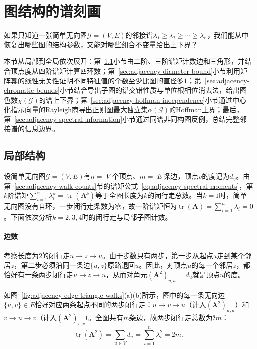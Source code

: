 \section{图结构的谱刻画}
\label{sec:adjacency-spectral-structure}

如果只知道一张简单无向图$\mathcal G=(V,E)$的邻接谱$\lambda_1\ge\lambda_2\ge\cdots\ge\lambda_n$，我们能从中恢复出哪些图的结构参数，又能对哪些组合不变量给出上下界？

本节从局部到全局依次展开：第~\ref{sec:adjacency-low-spectral-moments}小节由二阶、三阶谱矩计数边和三角形，并结合顶点度从四阶谱矩计算四环数；第~\ref{sec:adjacency-diameter-bound}小节利用矩阵幂的线性无关性证明不同特征值的个数至少比图的直径多$1$；第~\ref{sec:adjacency-chromatic-bounds}小节结合导出子图的谱交错性质与单位根相位消去法，给出图色数$\chi(\mathcal G)$的谱上下界；第~\ref{sec:adjacency-hoffman-independence}小节通过中心化指示向量的Rayleigh商导出正则图最大独立集$\alpha(\mathcal G)$的Hoffman上界；最后，第~\ref{sec:adjacency-spectral-information}小节通过同谱非同构图反例，总结完整邻接谱的信息边界。

\subsection{局部结构}
\label{sec:adjacency-low-spectral-moments}

设简单无向图$\mathcal G=(V,E)$有$n=|V|$个顶点、$m=|E|$条边，顶点$v$的度记为$d_v$。由第~\ref{sec:adjacency-walk-counts}节的谱矩公式~\eqref{eq:adjacency-spectral-moments}，第$k$阶谱矩$\sum_{i=1}^n\lambda_i^k=\operatorname{tr}(\bm A^k)$等于全图长度为$k$的闭行走总数。当$k=1$时，简单无向图没有自环，一步闭行走条数为零，故一阶谱矩恒为$\operatorname{tr}(\bm A)=\sum_{i=1}^n\lambda_i=0$。下面依次分析$k=2,3,4$时的闭行走与局部子图计数。

\paragraph{边数}

考察长度为$2$的闭行走$u\to z\to u$。由于步数只有两步，第一步从起点$u$走到某个邻居$z$，第二步必须沿同一条边$\{u,z\}$原路退回$u$。因此，对顶点$u$的每一个邻居$z$，都恰好有一条两步闭行走$u\to z\to u$，从而对角元$(\bm A^2)_{u,u}=d_u$就是顶点$u$的度。

如图~\ref{fig:adjacency-edge-triangle-walks}(a)(b)所示，图中的每一条无向边$\{u,v\}\in E$恰好对应两条起点不同的两步闭行走：$u\to v\to u$（计入$(\bm A^2)_{u,u}$）和$v\to u\to v$（计入$(\bm A^2)_{v,v}$）。全图共有$m$条边，故两步闭行走总数为$2m$：
\[
\operatorname{tr}(\bm A^2)=\sum_{u\in V}d_u=\sum_{i=1}^n\lambda_i^2=2m.
\]

